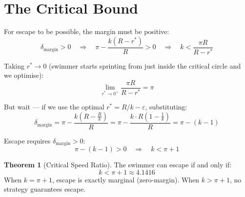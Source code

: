 \documentclass[12pt, a4paper]{article}
\theoremstyle{definition}
\newtheorem{theorem}{Theorem}
\begin{document}
\begin{center}
\end{center}

\section{The Critical Bound}

For escape to be possible, the margin must be positive:
\[
  \delta_{\text{margin}} > 0
  \quad\Longrightarrow\quad
  \pi - \frac{k(R - r^*)}{R} > 0
  \quad\Longrightarrow\quad
  k < \frac{\pi R}{R - r^*}
\]

Taking $r^* \to 0$ (swimmer starts sprinting from just inside the critical circle and we optimise):
\[
  \lim_{r^* \to 0^+} \frac{\pi R}{R - r^*} = \pi
\]

But wait — if we use the optimal $r^* = R/k - \varepsilon$, substituting:
\[
  \delta_{\text{margin}} = \pi - \frac{k\!\left(R - \tfrac{R}{k}\right)}{R}
  = \pi - \frac{k \cdot R(1 - \tfrac{1}{k})}{R}
  = \pi - (k - 1)
\]

Escape requires $\delta_{\text{margin}} > 0$:
\[
  \pi - (k-1) > 0
  \quad\Longrightarrow\quad
  k < \pi + 1
\]

\begin{resultbox}
\begin{theorem}[Critical Speed Ratio]
The swimmer can escape if and only if:
\[
  k < \pi + 1 \approx 4.1416
\]
When $k = \pi + 1$, escape is exactly marginal (zero-margin). When $k > \pi + 1$, no strategy guarantees escape.
\end{theorem}
\end{resultbox}

\end{document}

